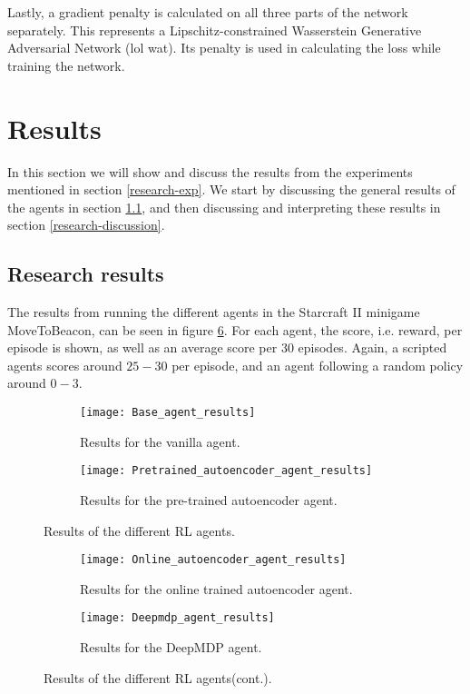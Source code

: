 Lastly, a gradient penalty is calculated on all three parts of the network separately. This represents a Lipschitz-constrained Wasserstein Generative Adversarial Network (lol wat). Its penalty is used in calculating the loss while training the network. 


\section{Results}\label{research-results}
In this section we will show and discuss the results from the experiments mentioned in section \ref{research-exp}. We start by discussing the general results of the agents in section \ref{research-general-results}, and then discussing and interpreting these results in section \ref{research-discussion}.

\subsection{Research results}\label{research-general-results}
The results from running the different agents in the Starcraft II minigame MoveToBeacon, can be seen in figure \ref{fig:results-agents}. For each agent, the score, i.e. reward, per episode is shown, as well as an average score per $30$ episodes. Again, a scripted agents scores around $25-30$ per episode, and an agent following a random policy around $0-3$.


\begin{figure}[h]
	\centering
	\begin{subfigure}[b]{1\textwidth}
		\texttt{[image: Base\_agent\_results]}
		\caption{Results for the vanilla agent.}
		\label{fig:results-base} 
	\end{subfigure}
	\begin{subfigure}[b]{1\textwidth}
		\texttt{[image: Pretrained\_autoencoder\_agent\_results]}
		\caption{Results for the pre-trained autoencoder agent.}
		\label{fig:results-ae}
	\end{subfigure}
	\caption{Results of the different RL agents.}
\end{figure}%
\begin{figure}[ht]\ContinuedFloat
	\begin{subfigure}[b]{1\textwidth}
		\texttt{[image: Online\_autoencoder\_agent\_results]}
		\caption{Results for the online trained autoencoder agent.}
		\label{fig:results-online-ae}
	\end{subfigure}
	\begin{subfigure}[b]{\textwidth}
		\texttt{[image: Deepmdp\_agent\_results]}
		\caption{Results for the DeepMDP agent.}
		\label{fig:results-deepmdp}
	\end{subfigure}
	\caption{Results of the different RL agents(cont.).}
	\label{fig:results-agents}
\end{figure}

